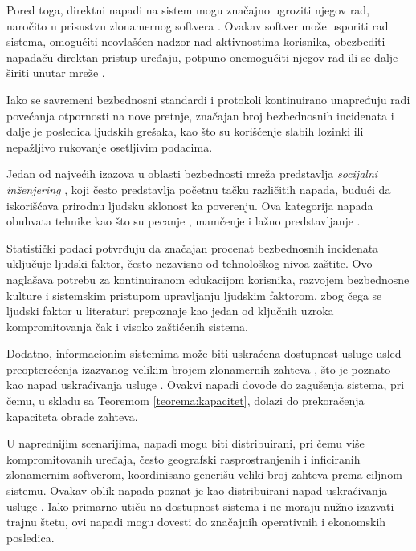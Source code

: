 Pored toga, direktni napadi na sistem mogu značajno ugroziti njegov rad, naročito u prisustvu zlonamernog softvera . Ovakav softver može usporiti rad sistema, omogućiti neovlašćen nadzor nad aktivnostima korisnika, obezbediti napadaču direktan pristup uređaju, potpuno onemogućiti njegov rad ili se dalje širiti unutar mreže \cite{rains2020cybersecurity}.

Iako se savremeni bezbednosni standardi i protokoli kontinuirano unapređuju radi povećanja otpornosti na nove pretnje, značajan broj bezbednosnih incidenata i dalje je posledica ljudskih grešaka, kao što su korišćenje slabih lozinki ili nepažljivo rukovanje osetljivim podacima.

Jedan od najvećih izazova u oblasti bezbednosti mreža predstavlja \textit{socijalni inženjering} \cite{salahdine2019social}, koji često predstavlja početnu tačku različitih napada, budući da iskorišćava prirodnu ljudsku sklonost ka poverenju. Ova kategorija napada obuhvata tehnike kao što su pecanje , mamčenje  i lažno predstavljanje .

Statistički podaci \cite{yeo2022human, theHumanFactor} potvrđuju da značajan procenat bezbednosnih incidenata uključuje ljudski faktor, često nezavisno od tehnološkog nivoa zaštite. Ovo naglašava potrebu za kontinuiranom edukacijom korisnika, razvojem bezbednosne kulture i sistemskim pristupom upravljanju ljudskim faktorom, zbog čega se ljudski faktor u literaturi prepoznaje kao jedan od ključnih uzroka kompromitovanja čak i visoko zaštićenih sistema.

Dodatno, informacionim sistemima može biti uskraćena dostupnost usluge usled preopterećenja izazvanog velikim brojem zlonamernih zahteva \cite{lau2000distributed}, što je poznato kao napad uskraćivanja usluge . Ovakvi napadi dovode do zagušenja sistema, pri čemu, u skladu sa Teoremom \ref{teorema:kapacitet}, dolazi do prekoračenja kapaciteta obrade zahteva.

U naprednijim scenarijima, napadi mogu biti distribuirani, pri čemu više kompromitovanih uređaja, često geografski rasprostranjenih i inficiranih zlonamernim softverom, koordinisano generišu veliki broj zahteva prema ciljnom sistemu. Ovakav oblik napada poznat je kao distribuirani napad uskraćivanja usluge . Iako primarno utiču na dostupnost sistema i ne moraju nužno izazvati trajnu štetu, ovi napadi mogu dovesti do značajnih operativnih i ekonomskih posledica.